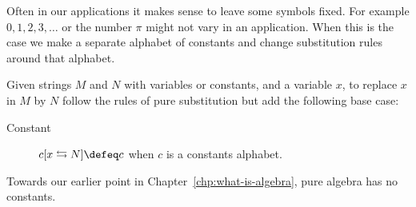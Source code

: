 




Often in our applications it makes sense to leave some symbols fixed.
For example $0,1,2,3,\ldots$ or the number $\pi$ might not vary in an application.
When this is the case we make a separate alphabet of constants and change substitution 
rules around that alphabet.
\begin{definition}
    Given strings $M$ and $N$ with variables or constants, 
    and a variable $x$, to replace $x$ in $M$ by $N$ 
    follow the rules of pure substitution but add the following  base case:
    \begin{description}
        \item[Constant] $c[x\leftrightarrows N]\defeq c$ when $c$ is a constants alphabet. 
    \end{description}
\end{definition}

Towards our earlier point in Chapter~\ref{chp:what-is-algebra}, pure algebra has no constants.
